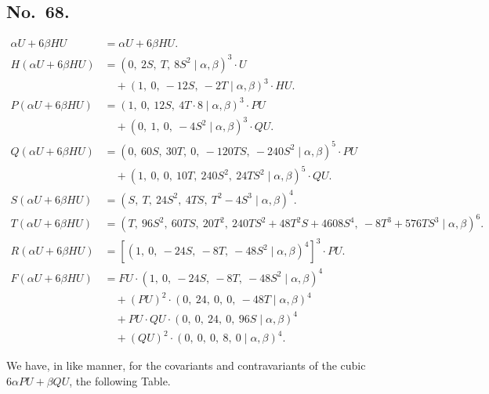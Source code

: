 \documentclass[11pt]{article}
\begin{document}
\subsection*{No.\ 68.}
\begin{align*}
\alpha U + 6\beta HU &= \alpha U + 6\beta HU. \\[3pt]
H(\alpha U + 6\beta HU) &= (0,\ 2S,\ T,\ 8 S^2 \mid \alpha, \beta)^3 \cdot U \\
   &\quad + (1,\ 0,\ -12S,\ -2T \mid \alpha, \beta)^3 \cdot HU. \\[3pt]
P(\alpha U + 6\beta HU) &= (1,\ 0,\ 12S,\ 4T \cdot 8 \mid \alpha, \beta)^3 \cdot PU \\
   &\quad + (0,\ 1,\ 0,\ -4S^2 \mid \alpha, \beta)^3 \cdot QU. \\[3pt]
Q(\alpha U + 6\beta HU) &= (0,\ 60S,\ 30T,\ 0,\ -120TS,\ -240S^2 \mid \alpha,\beta)^5 \cdot PU \\
   &\quad + (1,\ 0,\ 0,\ 10T,\ 240S^2,\ 24 T S^2 \mid \alpha,\beta)^5 \cdot QU. \\[3pt]
S(\alpha U + 6\beta HU) &= (S,\ T,\ 24 S^2,\ 4 TS,\ T^2 - 4 S^3 \mid \alpha,\beta)^4. \\[3pt]
T(\alpha U + 6\beta HU) &= (T,\ 96 S^2,\ 60 TS,\ 20 T^2,\ 240 TS^2 + 48 T^2 S + 4608 S^4,\ -8 T^3 + 576 T S^3 \mid \alpha,\beta)^6. \\[3pt]
R(\alpha U + 6\beta HU) &= [(1,\ 0,\ -24 S,\ -8 T,\ -48 S^2 \mid \alpha,\beta)^4]^3 \cdot PU. \\[3pt]
F(\alpha U + 6\beta HU) &= FU \cdot (1,\ 0,\ -24 S,\ -8 T,\ -48 S^2 \mid \alpha, \beta)^4 \\
   &\quad + (PU)^2 \cdot (0,\ 24,\ 0,\ 0,\ -48 T \mid \alpha, \beta)^4 \\
   &\quad + PU \cdot QU \cdot (0,\ 0,\ 24,\ 0,\ 96 S \mid \alpha, \beta)^4 \\
   &\quad + (QU)^2 \cdot (0,\ 0,\ 0,\ 8,\ 0 \mid \alpha, \beta)^4.
\end{align*}

We have, in like manner, for the covariants and contravariants of the cubic $6\alpha PU + \beta QU$, the following Table.
\end{document}
